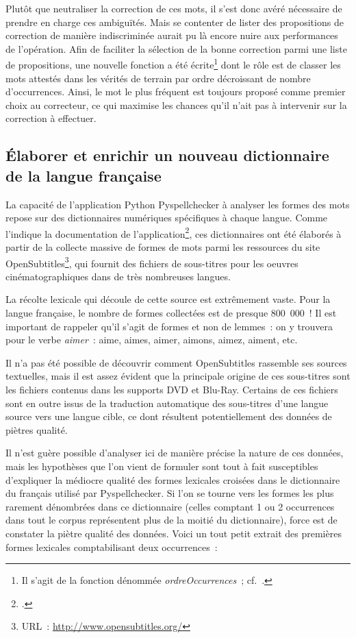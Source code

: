 \documentclass[a4paper,12pt,twoside]{book}
\begin{document}
				Plutôt que neutraliser la correction de ces mots, il s'est donc avéré nécessaire de prendre en charge ces ambiguïtés. Mais se contenter de lister des propositions de correction de manière indiscriminée aurait pu là encore nuire aux performances de l'opération. Afin de faciliter la sélection de la bonne correction parmi une liste de propositions, une nouvelle fonction a été écrite\footnote{Il s'agit de la fonction dénommée \textit{ordreOccurrences}~; cf.~\cite{biaySpellcheckTextsPy2022}.} dont le rôle est de classer les mots attestés dans les vérités de terrain par ordre décroissant de nombre d'occurrences. Ainsi, le mot le plus fréquent est toujours proposé comme premier choix au correcteur, ce qui maximise les chances qu'il n'ait pas à intervenir sur la correction à effectuer.
			
			\subsection{Élaborer et enrichir un nouveau dictionnaire de la langue française}
				La capacité de l'application Python Pyspellchecker à analyser les formes des mots repose sur des dictionnaires numériques spécifiques à chaque langue. Comme l'indique la documentation de l'application\footcite{barrusPyspellcheckerPurePython}, ces dictionnaires ont été élaborés à partir de la collecte massive de formes de mots parmi les ressources du site OpenSubtitles\footnote{URL~: \url{http://www.opensubtitles.org/}}, qui fournit des fichiers de sous-titres pour les oeuvres cinématographiques dans de très nombreuses langues.
				
				La récolte lexicale qui découle de cette source est extrêmement vaste. Pour la langue française, le nombre de formes collectées est de presque 800~000~! Il est important de rappeler qu'il s'agit de formes et non de lemmes~: on y trouvera pour le verbe \textit{aimer}~: aime, aimes, aimer, aimons, aimez, aiment, etc.
				
				Il n'a pas été possible de découvrir comment OpenSubtitles rassemble ses sources textuelles, mais il est assez évident que la principale origine de ces sous-titres sont les fichiers contenus dans les supports DVD et Blu-Ray. Certains de ces fichiers sont en outre issus de la traduction automatique des sous-titres d'une langue source vers une langue cible, ce dont résultent potentiellement des données de piètres qualité.
				
				Il n'est guère possible d'analyser ici de manière précise la nature de ces données, mais les hypothèses que l'on vient de formuler sont tout à fait susceptibles d'expliquer la médiocre qualité des formes lexicales croisées dans le dictionnaire du français utilisé par Pyspellchecker. Si l'on se tourne vers les formes les plus rarement dénombrées dans ce dictionnaire (celles comptant 1 ou 2 occurrences dans tout le corpus représentent plus de la moitié du dictionnaire), force est de constater la piètre qualité des données. Voici un tout petit extrait des premières formes lexicales comptabilisant deux occurrences~: 
				
\end{document}
